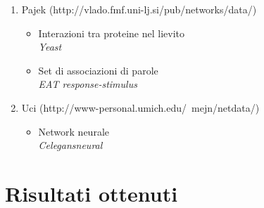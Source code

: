 \documentclass[twoside,openright,titlepage,fleqn,
	headinclude,11pt,a4paper,BCOR5mm,footinclude,pdftex
	]{scrbook}
\begin{document}
\begin{enumerate}
\begin{itemize}
\textit{Davis’ Southern Women Club}
\item Social Network e Forum Network\\
\textit{Facebook-like Social Network,Facebook-like Forum Network}
\item Network di Freeman\\
\textit{Freeman’s EIES dataset(personal relationships;time 1),Freeman’s EIES dataset(personal relationships;time 2),Freeman’s EIES dataset(messages)}
\item Network di collaborazione Scientifica di Newman\\
\textit{Newman’s scientific collaboration network}
\item Network di tre aereoporti statunitensi\\
\textit{USairport500,USairport\textunderscore 2010Openflights}
\item Grafo di una rete elettrica statunitense\\
\textit{USpowergrid\textunderscore n4941}\\
\end{itemize}
\item Pajek (http://vlado.fmf.uni-lj.si/pub/networks/data/)
\begin{itemize}
\item Interazioni tra proteine nel lievito\\
\textit{Yeast}
\item Set di associazioni di parole \\
\textit{EAT response-stimulus}
\end {itemize}
\item Uci (http://www-personal.umich.edu/~mejn/netdata/)
\begin{itemize}
\item Network neurale\\
\textit{Celegansneural}\\
\end{itemize}
\end{enumerate}


\section{Risultati ottenuti}
\end{document}
